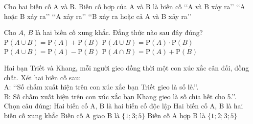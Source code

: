 

\begin{ex}%
	Cho hai biến cố A và B. Biến cố hợp của A và B là  biến cố
	\choice 
		{\lq\lq  A và B xảy ra\rq\rq }
		{\True \lq\lq  A hoặc B xảy ra\rq\rq }
		{\lq\lq A  xảy ra\rq\rq }
		 {\lq\lq B xảy ra hoặc cả A và B xảy ra\rq\rq }
\end{ex}

\begin{ex}%
	Cho $A$, $B$ là hai biến cố  xung khắc. Đẳng thức nào sau đây đúng?
	\choice 
		{\True $\mathrm{P}(A\cup  B)=\mathrm{P}(A)+\mathrm{P}(B)$}
		{$\mathrm{P}(A\cup B)=\mathrm{P}(A)\cdot \mathrm{P}(B)$} 
		{$\mathrm{P}(A\cup  B)=\mathrm{P}(A)-\mathrm{P}(B)$}
		{$\mathrm{P}(A\cap B)=\mathrm{P}(A)+\mathrm{P}(B)$} 
\end{ex}

\begin{ex}%
	Hai bạn Triết và Khang, mỗi người gieo đồng thời một con xúc xắc cân đối, đồng chất. Xét hai  biến cố sau:\\
	A: \lq\lq Số chấm xuất hiện trên con xúc xắc bạn Triết gieo là số  lẻ.\rq\rq .\\
	B: Số chấm xuất hiện trên con  xúc xắc bạn Khang gieo là số chia hết cho 5.\rq\rq .\\
	 Chọn câu đúng:
	\choice 
		{\True Hai biến cố A, B là hai biến  cố độc lập}
		{Hai  biến cố A, B là hai biến cố xung khắc}
		 {Biến cố A giao B là $\{1;3;5\}$}
		{Biến cố A hợp B là $\{1;2;3;5\}$} 
\end{ex}

